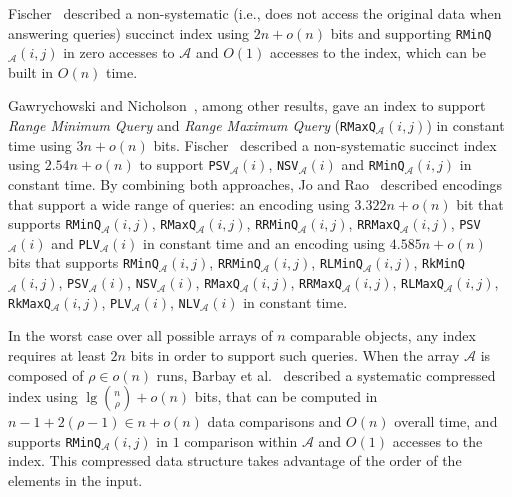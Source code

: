 Fischer~\cite{2010-LATIN-OptimalSuccinctnessForRangeMinimumQueries-Fischer}
described a non-systematic (i.e., does not access the original data
when answering queries) succinct index using $2n+o(n)$ bits and
supporting \texttt{RMinQ}$_{\mathcal{A}}(i,j)$ in zero accesses to
$\mathcal{A}$ and $O(1)$ accesses to the index, which can be built in
$O(n)$ time.

Gawrychowski and
Nicholson~\cite{2015-ICALP-OptimalEncodingsForRangeTopKSelectionAndMinMax-GawrychowskiNicholson},
among other results, gave an index to support \emph{Range Minimum
  Query} and \emph{Range Maximum Query}
(\texttt{RMaxQ}$_{\mathcal{A}}(i,j)$) in constant time using
$3n + o(n)$ bits.
Fischer~\cite{2011-TCS-CombinedDataStructureForPreviousAndNextSmallerValues-Fischer}
described a non-systematic succinct index using $2.54n + o(n)$ to
support \texttt{PSV}$_{\mathcal{A}}(i)$,
\texttt{NSV}$_{\mathcal{A}}(i)$ and
\texttt{RMinQ}$_{\mathcal{A}}(i,j)$ in constant time. By combining both approaches, Jo
and
Rao~\cite{2015-COCOON-SimultaneousEncodingsForRangeAndNextPreviousLargerSmallerValueQueries-JoRao}
described encodings that support a wide range of queries: an encoding
using $3.322n + o(n)$ bit that supports
\texttt{RMinQ}$_{\mathcal{A}}(i,j)$,
\texttt{RMaxQ}$_{\mathcal{A}}(i,j)$,
\texttt{RRMinQ}$_{\mathcal{A}}(i,j)$,
\texttt{RRMaxQ}$_{\mathcal{A}}(i,j)$, \texttt{PSV}$_{\mathcal{A}}(i)$
and \texttt{PLV}$_{\mathcal{A}}(i)$ in constant time and an encoding
using $4.585n + o(n)$ bits that supports
\texttt{RMinQ}$_{\mathcal{A}}(i,j)$,
\texttt{RRMinQ}$_{\mathcal{A}}(i,j)$,
\texttt{RLMinQ}$_{\mathcal{A}}(i,j)$,
\texttt{RkMinQ}$_{\mathcal{A}}(i,j)$, \texttt{PSV}$_{\mathcal{A}}(i)$,
\texttt{NSV}$_{\mathcal{A}}(i)$, \texttt{RMaxQ}$_{\mathcal{A}}(i,j)$,
\texttt{RRMaxQ}$_{\mathcal{A}}(i,j)$,
\texttt{RLMaxQ}$_{\mathcal{A}}(i,j)$,
\texttt{RkMaxQ}$_{\mathcal{A}}(i,j)$, \texttt{PLV}$_{\mathcal{A}}(i)$,
\texttt{NLV}$_{\mathcal{A}}(i)$ in constant time.

In the worst case over all possible arrays of $n$ comparable objects,
any index requires at least $2n$ bits in order to support such
queries.
% 
When the array ${\mathcal{A}}$ is composed of $\rho \in o(n)$ runs,
Barbay et
al.~\cite{2012-TCS-LRMTreesCompressedIndicesAdaptiveSortingAndCompressedPermutations-BarbayFischerNavarro}
described a systematic compressed index using
$\lg{n\choose \rho} + o(n)$ bits, that can be computed in
$n-1+2(\rho-1) \in n+o(n)$ data comparisons and $O(n)$ overall time,
and supports \texttt{RMinQ}$_{\mathcal{A}}(i,j)$ in $1$ comparison
within ${\mathcal{A}}$ and $O(1)$ accesses to the index. This
compressed data structure takes advantage of the order of the elements
in the input.

